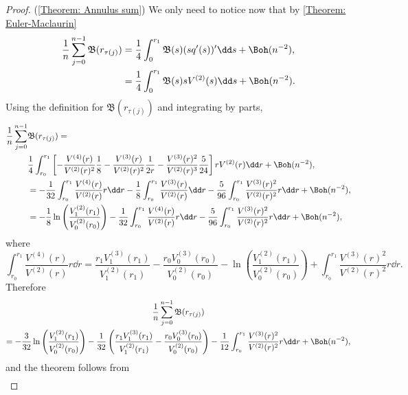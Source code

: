 \begin{proof} (\autoref{Theorem: Annulus sum})
	We only need to notice now that by \autoref{Theorem: Euler-Maclaurin}
	\begin{align}
		\frac{1}{n} \sum_{j=0}^{n-1} \mathfrak{B}(r_{\tau(j)}) & = \frac{1}{4} \int_{0}^{r_1} \mathfrak{B}(s) (s q'(s))' \dd s + \Boh(n^{-2}), \\
		& = \frac{1}{4} \int_{0}^{r_1} \mathfrak{B}(s) s V^{(2)}(s) \dd s + \Boh(n^{-2}).
	\end{align}
	Using the definition for $\mathfrak{B}(r_{\tau(j)})$ and integrating by parts,
	\begin{align}
		\frac{1}{n} \sum_{j=0}^{n-1} & \mathfrak{B}(r_{\tau(j)}) = \\
		& \frac{1}{4} \int_{r_0}^{r_1} \left[ -\frac{V^{(4)}(r)}{V^{(2)}(r)^2} \frac{1}{8} - \frac{V^{(3)}(r)}{V^{(2)}(r)^{2}} \frac{1}{2 r} - \frac{V^{(3)}(r)^2}{V^{(2)}(r)^{3}} \frac{5}{24} \right] r V^{(2)}(r) \dd r + \Boh(n^{-2}),\\
		& = - \frac{1}{32} \int_{r_0}^{r_1} \frac{V^{(4)}(r)}{V^{(2)}(r)} r \dd r - \frac{1}{8} \int_{r_0}^{r_1} \frac{V^{(3)}(r)}{V^{(2)}(r)} \dd r - \frac{5}{96} \int_{r_0}^{r_1} \frac{V^{(3)}(r)^2}{V^{(2)}(r)^{2}} r \dd r + \Boh(n^{-2}),\\
		& = - \frac{1}{8} \ln\left( \frac{V^{(2)}_1(r_1)}{V^{(2)}_0(r_0)} \right) - \frac{1}{32} \int_{r_0}^{r_1} \frac{V^{(4)}(r)}{V^{(2)}(r)} r \dd r - \frac{5}{96} \int_{r_0}^{r_1} \frac{V^{(3)}(r)^2}{V^{(2)}(r)^{2}} r \dd r + \Boh(n^{-2}),
	\end{align}
	where
	\begin{equation}
		 \int_{r_0}^{r_1} \frac{V^{(4)}(r)}{V^{(2)}(r)} r \dd r =  \frac{r_1  V^{(3)}_1(r_1)}{V^{(2)}_1(r_1)} - \frac{r_0 V^{(3)}_0(r_0)}{V^{(2)}_0(r_0)} - \ln \left( \frac{V^{(2)}_1(r_1)}{V^{(2)}_0(r_0)}\right) +   \int_{r_0}^{r_1} \frac{V^{(3)}(r)^2}{V^{(2)}(r)^{2}} r \dd r.
	\end{equation}
	Therefore
	\begin{multline}
			\frac{1}{n} \sum_{j=0}^{n-1} \mathfrak{B}(r_{\tau(j)})  \\ = - \frac{3}{32} \ln\left( \frac{V^{(2)}_1(r_1)}{V^{(2)}_0(r_0)} \right) - \frac{1}{32} \left( \frac{r_1  V^{(3)}_1(r_1)}{V^{(2)}_1(r_1)} - \frac{r_0 V^{(3)}_0(r_0)}{V^{(2)}_0(r_0)}\right) - \frac{1}{12} \int_{r_0}^{r_1} \frac{V^{(3)}(r)^2}{V^{(2)}(r)^{2}} r \dd r + \Boh(n^{-2}),
			\label{Equation: Summation on B}
	\end{multline}
	and the theorem follows from
	\begin{multline}

\end{multline}
\end{proof}
